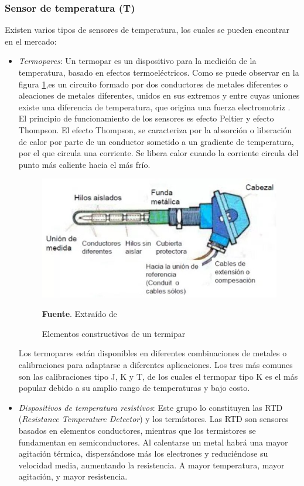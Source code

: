\subsubsection{Sensor de temperatura (T)}
Existen varios tipos de sensores de temperatura, los cuales se pueden encontrar en el mercado: 
\begin{itemize}
    \item \textit{Termopares}: Un  termopar  es  un  dispositivo  para  la  medición  de  la  temperatura,  basado  en  efectos  termoeléctricos.  Como se puede observar en la figura \ref{fig:Termopar},es  un  circuito   formado   por   dos   conductores   de   metales   diferentes  o  aleaciones  de  metales  diferentes,  unidos  en  sus extremos y entre cuyas uniones existe una diferencia de temperatura, que origina una fuerza electromotriz \cite{rodriguez_medicion_2007}. 
    El principio de funcionamiento de los sensores es efecto Peltier y efecto Thompson. El  efecto  Thompson,  se  caracteriza  por  la  absorci\'on  o  liberaci\'on de calor por parte de un conductor sometido a un  gradiente  de  temperatura,  por  el  que  circula  una  corriente.    Se  libera  calor  cuando  la  corriente  circula  del  punto m\'as caliente hacia el m\'as fr\'io\cite{logvinov_principios_2007}.
    
    \begin{figure}[ht]
    \centering
    \label{fig:Termopar}
    \includegraphics[scale=0.6]{Imagenes/cap2/termopar.jpg}\\
    \bigskip
    \raggedright
    \caption {Elementos constructivos de un termipar}  \textbf{Fuente}. Extra\'ido de \cite{universidad_de_carabobo_-termopares_nodate}
    \end{figure}
    Los termopares están disponibles en diferentes combinaciones de metales o calibraciones para adaptarse a diferentes aplicaciones. Los tres más comunes son las calibraciones tipo J, K y T, de los cuales el termopar tipo K es el más popular debido a su amplio rango de temperaturas y bajo costo\cite{omega_termopar_nodate}.
    \item \textit{Dispositivos de temperatura resistivos}: Este    grupo    lo    constituyen    las    RTD    (\textit{Resistance    Temperature  Detector})  y  los  term\'istores.  Las  RTD  son  sensores basados en elementos conductores, mientras que los termistores se fundamentan en semiconductores.
    Al calentarse un metal habrá una mayor agitación térmica, dispersándose más los electrones y reduciéndose su velocidad media, aumentando la resistencia. A mayor temperatura, mayor agitación, y mayor resistencia.
    

\end{itemize}

